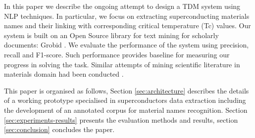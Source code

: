 \documentclass{article}[a4]
\begin{document}



In this paper we describe the ongoing attempt to design a TDM system using NLP techniques. In particular, we focus on extracting superconducting materials names and their linking with corresponding critical temperature (Tc) values.
Our system is built on an Open Source library for text mining for scholarly documents: Grobid \cite{GROBID}. We evaluate the performance of the system using precision, recall and F1-score. Such performance provides baseline for measuring our progress in solving the task.
Similar attempts of mining scientific literature in materials domain had been conducted \cite{nanocrystal_extraction} \cite{court2018auto}. 

This paper is organised as follows, Section \ref{sec:architecture} describes the details of a working prototype specialised in superconductors data extraction including the development of an annotated corpus for material names recognition. Section \ref{sec:experiments-results} presents the evaluation methods and results, section \ref{sec:conclusion} concludes the paper.
\end{document}
